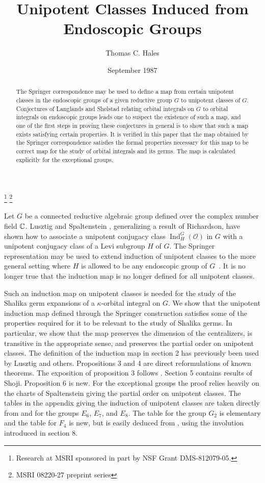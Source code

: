 \documentclass{amsart}
\newcommand\C		{{\Bbb C}}
\newcommand\Ind	{\operatorname{Ind}}
\newcommand\cO		{{\mathcal O}}
\begin{document}
\begin{abstract}
The Springer correspondence may be used to define a map from
certain unipotent classes in the endoscopic groups of a given
reductive group $G$ to unipotent classes of $G$.  Conjectures of
Langlands and Shelstad relating orbital integrals on $G$ to
orbital integrals on endoscopic groups leads one to suspect the
existence of such a map, and one of the first steps in proving
these conjectures in general is to show that such a map exists
satisfying certain properties. It is verified in this paper that
the map obtained by the Springer correspondence satisfies the
formal properties necessary for this map to be correct map for
the study of orbital integrals and its germs.  The map is
calculated explicitly for the exceptional groups.
\end{abstract}


\title {Unipotent Classes Induced from Endoscopic Groups}
\author {Thomas C. Hales}
\thanks{Research at MSRI sponsored in part by NSF Grant DMS-812079-05.}
\thanks{MSRI 08220-27 preprint series}
\date{September 1987}
\address{Mathematical Sciences Research Institute}

\maketitle

Let $G$ be a connected reductive algebraic group defined over the
complex
number field $\C$.  Lusztig and Spaltenstein \cite{LS},
generalizing a result
of Richardson, have shown 
how to associate a unipotent conjugacy class $\Ind_H^G(\cO)$ in
$G$ with a
unipotent conjugacy class of a Levi subgroup $H$ of $G$.  The
Springer 
representation may be used to extend induction of unipotent
classes to the
more general setting where $H$ is allowed to be any endoscopic
group of 
$G$~\cite{Lu}.  It is no longer true that the
induction map is no longer defined for all unipotent classes.

Such an induction map on unipotent classes is needed for the
study of the
Shalika germ expansions of a $\kappa$-orbital integral on $G$. 
We show that 
the unipotent induction map defined through the Springer
construction satisfies
some of the properties required for it to be relevant to the
study of Shalika
germs.  In particular, we show that the map preserves the
dimension of the
centralizers, is transitive in the appropriate sense, and
preserves the 
partial order on unipotent classes.  
The definition of the induction map in section 2 has previously
been used by Lusztig and others.  Propositions 3 and 4 are direct
reformulations of known theorems.  The exposition of proposition
3 follows \cite{LS}.  Section 5 contains results of Shoji. 
Proposition 6 is new.  For the exceptional groups the proof
relies heavily on the charts of Spaltenstein giving the partial
order on unipotent classes.  The tables in the appendix giving
the induction of unipotent classes are taken directly from
\cite{AL} and \cite{A} for the groups $E_6$, $E_7$, and $E_8$. 
The table for the group $G_2$ is elementary and the table for
$F_4$ is new, but is easily deduced from \cite{A}, using the
involution introduced in section 8.
\end{document}
